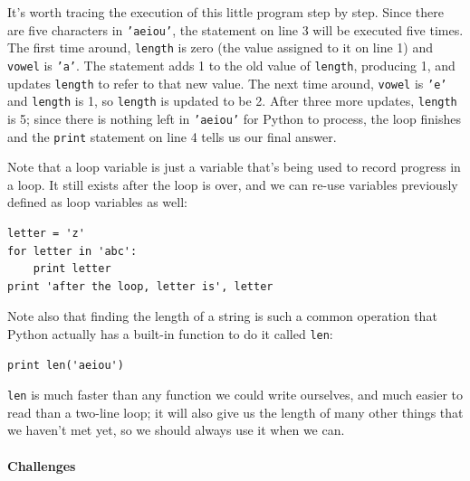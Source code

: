 \documentclass[]{book}
\begin{document}
It's worth tracing the execution of this little program step by step.
Since there are five characters in \texttt{'aeiou'}, the statement on
line 3 will be executed five times. The first time around,
\texttt{length} is zero (the value assigned to it on line 1) and
\texttt{vowel} is \texttt{'a'}. The statement adds 1 to the old value of
\texttt{length}, producing 1, and updates \texttt{length} to refer to
that new value. The next time around, \texttt{vowel} is \texttt{'e'} and
\texttt{length} is 1, so \texttt{length} is updated to be 2. After three
more updates, \texttt{length} is 5; since there is nothing left in
\texttt{'aeiou'} for Python to process, the loop finishes and the
\texttt{print} statement on line 4 tells us our final answer.

Note that a loop variable is just a variable that's being used to record
progress in a loop. It still exists after the loop is over, and we can
re-use variables previously defined as loop variables as well:

\begin{verbatim}
letter = 'z'
for letter in 'abc':
    print letter
print 'after the loop, letter is', letter
\end{verbatim}

Note also that finding the length of a string is such a common operation
that Python actually has a built-in function to do it called
\texttt{len}:

\begin{verbatim}
print len('aeiou')
\end{verbatim}

\texttt{len} is much faster than any function we could write ourselves,
and much easier to read than a two-line loop; it will also give us the
length of many other things that we haven't met yet, so we should always
use it when we can.

\mbox{}\paragraph{Challenges}
\end{document}
